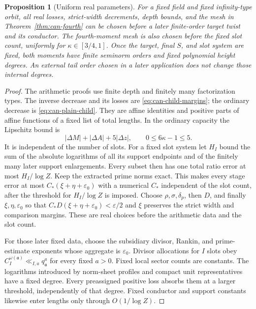 \documentclass[11pt,a4paper]{article}
\numberwithin{equation}{section}
\newtheorem{proposition}[theorem]{Proposition}
\theoremstyle{definition}
\theoremstyle{remark}
\newcommand{\eps}{\varepsilon}
\begin{document}
\begin{proposition}[Uniform real parameters]\label{prop:can-uniformity}
For a fixed field and fixed infinity-type orbit, all real losses,
strict-width decrements, depth bounds, and the mesh in
Theorem~\ref{thm:can-fourth} can be chosen before a later
finite-order target twist and its conductor.  The fourth-moment
mesh is also chosen before the fixed slot count, uniformly for
$\kappa\in[3/4,1]$.  Once the target, final $S$, and slot system
are fixed, both moments have finite seminorm orders and fixed
polynomial height degrees.  An external tail order chosen in
a later application does not change those internal degrees.
\end{proposition}
\begin{proof}
The arithmetic proofs use finite depth and finitely many
factorization types.  The inverse decrease and its losses are
\eqref{eq:can-child-margins}; the ordinary decrease is
\eqref{eq:can-plain-child}.  They are affine identities and
positive parts of affine functions of a fixed list of total
lengths.  In the ordinary capacity the Lipschitz bound is
\[
 |\Delta M|+|\Delta A|+5|\Delta z|,
 \qquad 0\le6\kappa-1\le5.
\]
It is independent of the number of slots.
For a fixed slot system let $H_I$ bound the sum of the absolute
logarithms of all its support endpoints and of the finitely
many later support enlargements.  Every subset then has one
total ratio error at most $H_I/\log Z$.  Keep the extracted prime norms exact.  This makes every stage
error at most $C_*(\xi+\eta+\eps_0)$ with a numerical $C_*$
independent of the slot count, after the threshold for
$H_I/\log Z$ is imposed.  Choose $\rho,\sigma,\delta_p$, then
$D$, and finally $\xi,\eta,\eps_0$ so that
$C_*D(\xi+\eta+\eps_0)<\eps/2$ and $\xi$ preserves the
strict width and comparison margins.  These are real choices
before the arithmetic data and the slot count.

For those later fixed data, choose the subsidiary divisor,
Rankin, and prime-estimate exponents whose aggregate is
$\eps_0$.  Divisor allocations for $I$ slots obey
$C_I^{\omega(\mathfrak a)}\ll_{I,a}q_{\mathfrak a}^a$
for every fixed $a>0$.  Fixed local sector counts are constants.
The logarithms introduced by norm-sheet profiles and compact
unit representatives have a fixed degree.  Every preassigned
positive loss absorbs them at a larger threshold, independently
of that degree.  Fixed conductor and support constants likewise
enter lengths only through $O(1/\log Z)$.


\end{proof}
\end{document}
